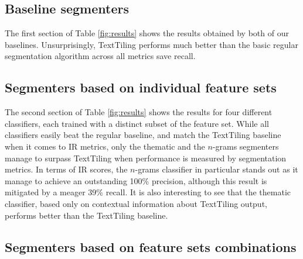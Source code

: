 \subsection{Baseline segmenters}

The first section of Table \ref{fig:results} shows the results obtained by both of our baselines. Unsurprisingly, TextTiling performs much better than the basic regular segmentation algorithm across all metrics save recall.

\subsection{Segmenters based on individual feature sets}


The second section of Table \ref{fig:results} shows the results for four different classifiers, each trained with a distinct subset of the feature set. While all classifiers easily beat the regular baseline, and match the TextTiling baseline when it comes to IR metrics, only the thematic and the $n$-grams segmenters manage to surpass TextTiling when performance is measured by segmentation metrics. In terms of IR scores, the $n$-grams classifier in particular stands out as it manage to achieve an outstanding 100\% precision, although this result is mitigated by a meager 39\% recall. It is also interesting to see that the thematic classifier, based only on contextual information about TextTiling output, performs better than the TextTiling baseline.


\subsection{Segmenters based on feature sets combinations}

